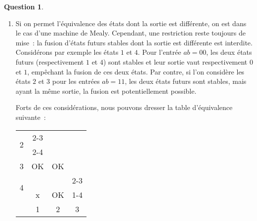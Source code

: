 \documentclass[11pt,a4paper]{article}
\theoremstyle{definition}%
\newtheorem{Q}{Question}[] %
\begin{document}
\begin{Q}
{\begin{enumerate}
\begin{center}

		\end{center}

		\item Si on permet l'équivalence des états dont la sortie est différente, on est dans le cas d'une machine de Mealy.
		Cependant, une restriction reste toujours de mise~: la fusion d'états futurs stables dont la sortie est différente est interdite.
		Considérons par exemple les états $1$ et $4$. Pour l'entrée $ab = 00$, les deux états futurs (respectivement $1$ et $4$) sont stables et leur sortie vaut respectivement $0$ et $1$, empêchant la fusion de ces deux états.
		Par contre, si l'on considère les états $2$ et $3$ pour les entrées $ab = 11$, les deux états futurs sont stables, mais ayant la même sortie, la fusion est potentiellement possible.

		Forts de ces considérations, nous pouvons dresser la table d'équivalence suivante~:
		\begin{center}
			\begin{tabular}{cccc} \cline{1-2}
				\multicolumn{1}{|c|}{\multirow{2}{*}{2}}	&	\multicolumn{1}{c|}{\cellcolor{green!25}2-3} 					& 																	& \\
				\multicolumn{1}{|c|}{}						&	\multicolumn{1}{c|}{\cellcolor{green!25}2-4}					& 																	& \\ \cline{1-3}
				\multicolumn{1}{|c|}{3}	& 						\multicolumn{1}{c|}{\cellcolor{green!25}OK}						& \multicolumn{1}{c|}{\cellcolor{green!25} OK}						& \\ \cline{1-4}
				\multicolumn{1}{|c|}{\multirow{2}{*}{4}} & 		\multicolumn{1}{c|}{\cellcolor{red!25}}							& \multicolumn{1}{|c|}{\cellcolor{green!25}} 						& \multicolumn{1}{c|}{\cellcolor{red!25}2-3}\\
				\multicolumn{1}{|c|}{} & 						\multicolumn{1}{c|}{\multirow{-2}{*}{\cellcolor{red!25}x}} 	& \multicolumn{1}{|c|}{\multirow{-2}{*}{\cellcolor{green!25}OK}} 	& \multicolumn{1}{c|}{\cellcolor{red!25}1-4} \\ \cline{1-4}
			 & 													\multicolumn{1}{|c|}{1} & 										\multicolumn{1}{c|}{2} 											& \multicolumn{1}{c|}{3} \\ \cline{2-4}
			\end{tabular}
		\end{center}


\end{enumerate}}
\end{Q}
\end{document}
